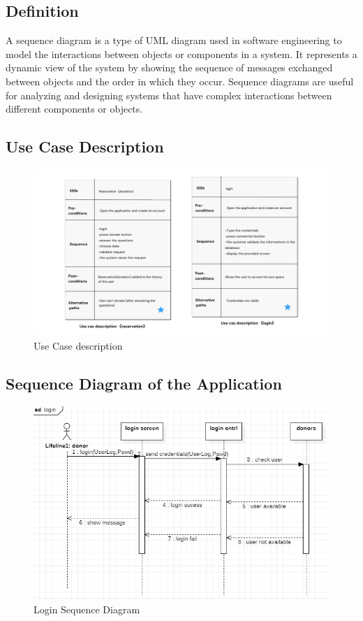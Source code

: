 \subsection{Definition}
A sequence diagram is a type of UML diagram used in software engineering to model the interactions between objects or components in a system. It represents a dynamic view of the system by showing the sequence of messages exchanged between objects and the order in which they occur. Sequence diagrams are useful for analyzing and designing systems that have complex interactions between different components or objects.
\subsection{Use Case Description}

\begin{figure}[H]
    \centering
    \includegraphics[width=1\textwidth]{images/Let's brainstorm for thoughts, ideas, and inspiration using an idea board..png}
    \caption{Use Case description}
    \label{fig:figure4}
\end{figure}
\subsection{Sequence Diagram of the Application}

\begin{figure}[H]
    \centering
    \includegraphics[width=1\textwidth]{images/login.png}
    \caption{ Login Sequence Diagram}
    \label{fig:figure4}
\end{figure}

